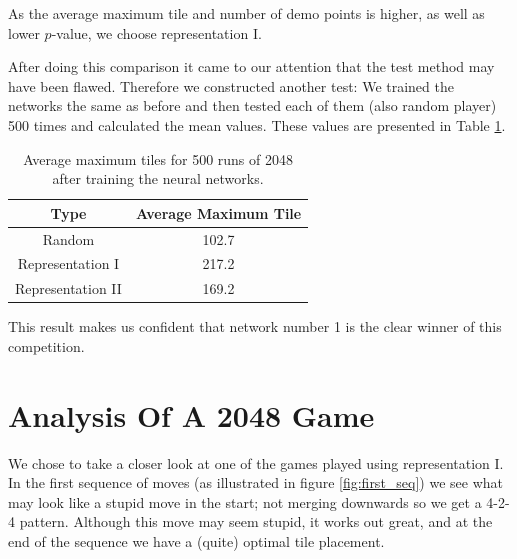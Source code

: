 \documentclass[11pt,a4paper]{article}
\begin{document}
As the average maximum tile and number of demo points is higher, as well as lower $p$-value, we choose representation I.

After doing this comparison it came to our attention that the test method may have been flawed. Therefore we constructed another test: We trained the networks the same as before and then tested each of them (also random player) 500 times and calculated the mean values. These values are presented in Table \ref{tab:mean}.

\begin{table}[h!]
\centering
\caption{Average maximum tiles for 500 runs of 2048 after training the neural networks.}
\begin{tabular}{cc}
Type & Average Maximum Tile \\
\hline
Random & 102.7 \\
Representation I & 217.2 \\
Representation II & 169.2
\end{tabular}
\label{tab:mean}
\end{table}

This result makes us confident that network number 1 is the clear winner of this competition.


\section*{Analysis Of A 2048 Game}
We chose to take a closer look at one of the games played using representation I. In the first sequence of moves (as illustrated in figure \ref{fig:first_seq}) we see what may look like a stupid move in the start; not merging downwards so we get a 4-2-4 pattern. Although this move may seem stupid, it works out great, and at the end of the sequence we have a (quite) optimal tile placement.
\end{document}
